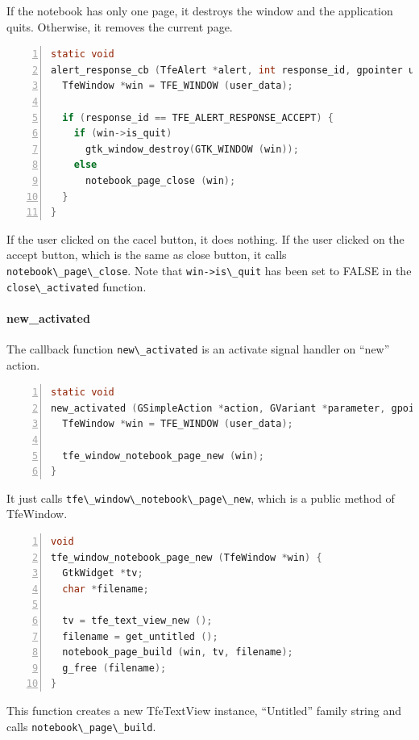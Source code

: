 If the notebook has only one page, it destroys the window and the
application quits. Otherwise, it removes the current page.

\begin{lstlisting}[language=C, numbers=left]
static void
alert_response_cb (TfeAlert *alert, int response_id, gpointer user_data) {
  TfeWindow *win = TFE_WINDOW (user_data);

  if (response_id == TFE_ALERT_RESPONSE_ACCEPT) {
    if (win->is_quit)
      gtk_window_destroy(GTK_WINDOW (win));
    else
      notebook_page_close (win);
  }
}
\end{lstlisting}

If the user clicked on the cacel button, it does nothing. If the user
clicked on the accept button, which is the same as close button, it
calls \passthrough{\lstinline!notebook\_page\_close!}. Note that
\passthrough{\lstinline!win->is\_quit!} has been set to FALSE in the
\passthrough{\lstinline!close\_activated!} function.

\paragraph{new\_activated}\label{new_activated}

The callback function \passthrough{\lstinline!new\_activated!} is an
activate signal handler on ``new'' action.

\begin{lstlisting}[language=C, numbers=left]
static void
new_activated (GSimpleAction *action, GVariant *parameter, gpointer user_data) {
  TfeWindow *win = TFE_WINDOW (user_data);

  tfe_window_notebook_page_new (win);
}
\end{lstlisting}

It just calls
\passthrough{\lstinline!tfe\_window\_notebook\_page\_new!}, which is a
public method of TfeWindow.

\begin{lstlisting}[language=C, numbers=left]
void
tfe_window_notebook_page_new (TfeWindow *win) {
  GtkWidget *tv;
  char *filename;

  tv = tfe_text_view_new ();
  filename = get_untitled ();
  notebook_page_build (win, tv, filename);
  g_free (filename);
}
\end{lstlisting}

This function creates a new TfeTextView instance, ``Untitled'' family
string and calls \passthrough{\lstinline!notebook\_page\_build!}.

